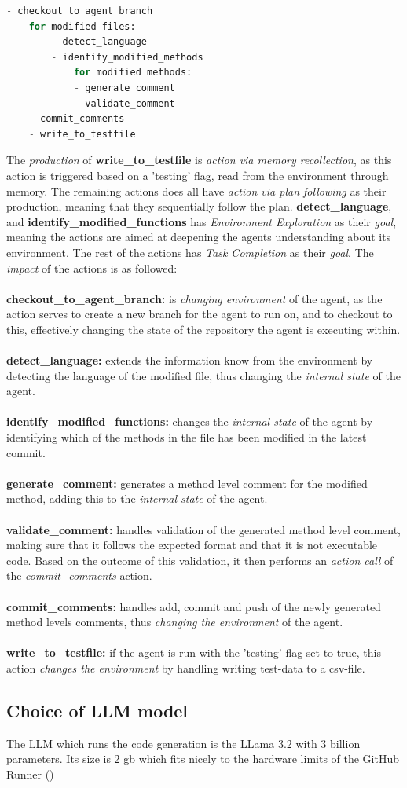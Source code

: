\begin{lstlisting}[language=Python, label={lst:plan_seq}, caption=The plan sequence of DocTides actions]
    - checkout_to_agent_branch
    for modified files:
        - detect_language
        - identify_modified_methods
            for modified methods:
            - generate_comment
            - validate_comment
    - commit_comments
    - write_to_testfile
\end{lstlisting}

\noindent
The \textit{production} of \textbf{write\_to\_testfile} is \textit{action via memory recollection}, as 
this action is triggered based on a 'testing' flag, read from the environment through memory. The remaining actions does all have \textit{action via plan following} as their production, meaning that they sequentially follow the plan. \textbf{detect\_language}, and \textbf{identify\_modified\_functions} has \textit{Environment Exploration} as their \textit{goal}, meaning the actions are aimed at deepening the agents understanding about its environment. The rest of the actions has \textit{Task Completion} as their \textit{goal}. The \textit{impact} of the actions is as followed:
\\\\
\textbf{checkout\_to\_agent\_branch:} is \textit{changing environment} of the agent, as the action serves to create a new branch for the agent to run on, and to checkout to this, effectively changing the state of the repository the agent is executing within.
\\ \\
\textbf{detect\_language:} extends the information know from the environment by detecting the language of the modified file, thus changing the \textit{internal state} of the agent.
\\ \\
\textbf{identify\_modified\_functions:} changes the \textit{internal state} of the agent by identifying which of the methods in the file has been modified in the latest commit.
\\ \\
\textbf{generate\_comment:} generates a method level comment for the modified method, adding this to the \textit{internal state} of the agent.
\\ \\
\textbf{validate\_comment:} handles validation of the generated method level comment, making sure that it follows the expected format and that it is not executable code. Based on the outcome of this validation, it then performs an \textit{action call} of the \textit{commit\_comments} action.
\\ \\
\textbf{commit\_comments:} handles add, commit and push of the newly generated method levels comments, thus \textit{changing the environment} of the agent.
\\ \\
\textbf{write\_to\_testfile:} if the agent is run with the 'testing' flag set to true, this action \textit{changes the environment} by handling writing test-data to a csv-file.

\subsection{Choice of LLM model}
The LLM which runs the code generation is the LLama 3.2 with 3 billion parameters. Its size is 2 gb which fits nicely to the hardware limits of the GitHub Runner ()
